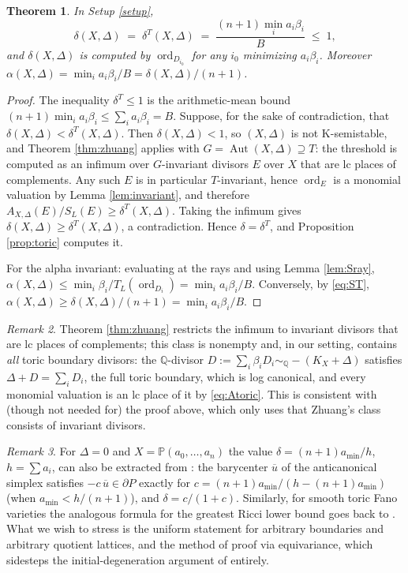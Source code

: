 \documentclass[11pt]{amsart}
\newtheorem{theorem}{Theorem}[section]
\theoremstyle{definition}
\theoremstyle{remark}
\newtheorem{remark}[theorem]{Remark}
\DeclareMathOperator{\ord}{ord}
\DeclareMathOperator{\Aut}{Aut}
\newcommand{\Q}{\mathbb{Q}}
\newcommand{\PP}{\mathbb{P}}
\newcommand{\bary}{\overline{u}}
\begin{document}
\begin{theorem}\label{thm:main}
In Setup \textup{\ref{setup}},
\[
\delta(X,\Delta)\;=\;\delta^T(X,\Delta)
\;=\;\frac{(n+1)\min_i a_i\beta_i}{B}\;\le\;1,
\]
and \(\delta(X,\Delta)\) is computed by \(\ord_{D_{i_0}}\) for any
\(i_0\) minimizing \(a_i\beta_i\). Moreover
\(\alpha(X,\Delta)=\min_i a_i\beta_i/B=\delta(X,\Delta)/(n+1)\).
\end{theorem}

\begin{proof}
The inequality \(\delta^T\le1\) is the arithmetic-mean bound
\((n+1)\min_ia_i\beta_i\le\sum_ia_i\beta_i=B\). Suppose, for the sake of
contradiction, that \(\delta(X,\Delta)<\delta^T(X,\Delta)\). Then
\(\delta(X,\Delta)<1\), so \((X,\Delta)\) is not K-semistable, and Theorem
\ref{thm:zhuang} applies with \(G=\Aut(X,\Delta)\supseteq T\): the
threshold is computed as an infimum over \(G\)-invariant divisors \(E\)
over \(X\) that are lc places of complements. Any such \(E\) is in
particular \(T\)-invariant, hence \(\ord_E\) is a monomial valuation by
Lemma \ref{lem:invariant}, and therefore
\(A_{X,\Delta}(E)/S_L(E)\ge\delta^T(X,\Delta)\). Taking the infimum
gives \(\delta(X,\Delta)\ge\delta^T(X,\Delta)\), a contradiction. Hence
\(\delta=\delta^T\), and Proposition \ref{prop:toric} computes it.

For the alpha invariant: evaluating at the rays and using Lemma
\ref{lem:Sray}, \(\alpha(X,\Delta)\le\min_i\beta_i/T_L(\ord_{D_i})
=\min_ia_i\beta_i/B\). Conversely, by \eqref{eq:ST},
\(\alpha(X,\Delta)\ge\delta(X,\Delta)/(n+1)=\min_ia_i\beta_i/B\).
\end{proof}

\begin{remark}\label{rem:complement}
Theorem \ref{thm:zhuang} restricts the infimum to invariant divisors that
are lc places of complements; this class is nonempty and, in our setting,
contains \emph{all} toric boundary divisors: the \(\Q\)-divisor
\(D:=\sum_i\beta_iD_i\sim_\Q-(K_X+\Delta)\) satisfies
\(\Delta+D=\sum_iD_i\), the full toric boundary, which is log canonical,
and every monomial valuation is an lc place of it by
\eqref{eq:Atoric}. This is consistent with (though not needed for) the
proof above, which only uses that Zhuang's class consists of invariant
divisors.
\end{remark}

\begin{remark}\label{rem:known}
For \(\Delta=0\) and \(X=\PP(a_0,\dots,a_n)\) the value
\(\delta=(n+1)a_{\min}/h\), \(h=\sum a_i\), can also be extracted from
\cite[Corollary 7.19]{BJ20}: the barycenter \(\bary\) of the anticanonical
simplex satisfies \(-c\,\bary\in\partial P\) exactly for
\(c=(n+1)a_{\min}/(h-(n+1)a_{\min})\) (when \(a_{\min}<h/(n+1)\)),
and \(\delta=c/(1+c)\). Similarly, for smooth toric Fano varieties
the analogous formula for the greatest Ricci lower bound goes back to
\cite{Li11}. What we wish to stress is the uniform statement for arbitrary
boundaries and arbitrary quotient lattices, and the method of proof via
equivariance, which sidesteps the initial-degeneration argument of
\cite[\S7]{BJ20} entirely.
\end{remark}
\end{document}
